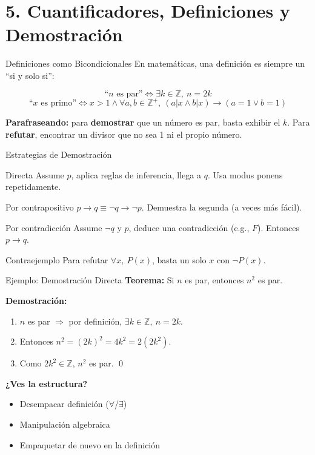 \documentclass[aspectratio=169,10pt]{beamer}
\begin{document}
\section{5. Cuantificadores, Definiciones y Demostración}

\begin{frame}{Definiciones como Bicondicionales}
En matemáticas, una \alert{definición} es siempre un ``si y solo si'':

\[
\text{``$n$ es par''} \iff \exists k \in \mathbb{Z},\ n = 2k
\]
\[
\text{``$x$ es primo''} \iff x>1 \land \forall a,b \in \mathbb{Z}^+,\ (a|x \land b|x) \to (a=1 \lor b=1)
\]

\vfill
\textbf{Parafraseando:} para \textbf{demostrar} que un número es par, basta exhibir el $k$.
Para \textbf{refutar}, encontrar un divisor que no sea 1 ni el propio número.
\end{frame}

\begin{frame}{Estrategias de Demostración}
\begin{block}{Directa}
Assume $p$, aplica reglas de inferencia, llega a $q$. \quad Usa modus ponens repetidamente.
\end{block}
\vfill
\begin{block}{Por contrapositivo}
$p \to q \equiv \neg q \to \neg p$. Demuestra la segunda (a veces más fácil).
\end{block}
\vfill
\begin{block}{Por contradicción}
Assume $\neg q$ y $p$, deduce una contradicción (e.g., $F$). Entonces $p \to q$.
\end{block}
\vfill
\begin{block}{Contraejemplo}
Para refutar $\forall x,\ P(x)$, basta un solo $x$ con $\neg P(x)$.
\end{block}
\end{frame}

\begin{frame}{Ejemplo: Demostración Directa}
\textbf{Teorema:} Si $n$ es par, entonces $n^2$ es par.

\vspace{0.5em}
\textbf{Demostración:}
\begin{enumerate}
\item[] $n$ es par $\Rightarrow$ por definición, $\exists k \in \mathbb{Z},\ n = 2k$.
\item[] Entonces $n^2 = (2k)^2 = 4k^2 = 2(2k^2)$.
\item[] Como $2k^2 \in \mathbb{Z}$, $n^2$ es par. \qed
\end{enumerate}

\vfill
\pause
\textbf{¿Ves la estructura?}
\begin{itemize}
\item[1.] Desempacar definición ($\forall$/$\exists$)
\item[2.] Manipulación algebraica
\item[3.] Empaquetar de nuevo en la definición
\end{itemize}
\end{frame}
\end{document}
